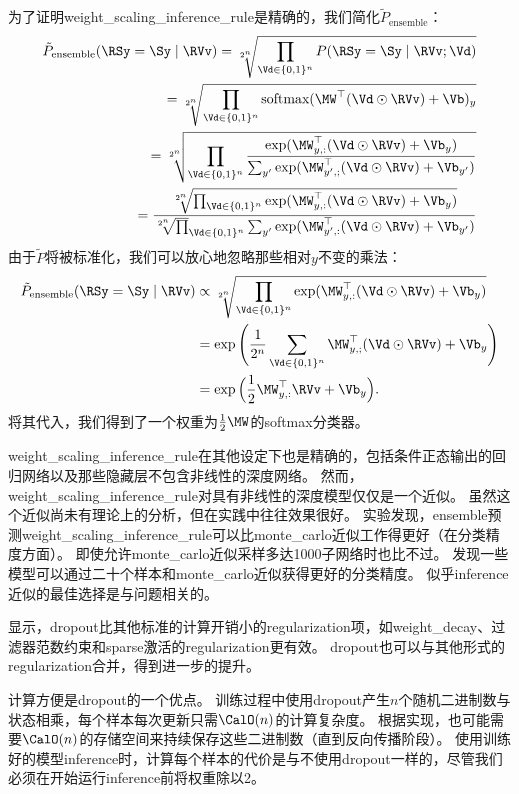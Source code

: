 为了证明\gls{weight_scaling_inference_rule}是精确的，我们简化$ \tilde{P}_{\text{ensemble}}$：
\begin{align}
\tilde{P}_{\text{ensemble}}(\RSy=\Sy \mid \RVv) =
\sqrt[2^n]{\prod_{\Vd \in \{0,1\}^n} P(\RSy = \Sy \mid \RVv; \Vd)} \\
= \sqrt[2^n]{\prod_{\Vd \in \{0,1\}^n} \text{softmax}(\MW^\top(\Vd \odot \RVv) + \Vb)_y} \\
= \sqrt[2^n]{\prod_{\Vd \in \{0,1\}^n} \frac{\exp (\MW_{y,:}^\top(\Vd \odot \RVv) + \Vb_y)}
{\sum_{y'}\exp (\MW_{y',;}^\top(\Vd \odot \RVv) + \Vb_{y'})}}\\
=  \frac{\sqrt[2^n]{\prod_{\Vd \in \{0,1\}^n}\exp (\MW_{y,:}^\top(\Vd \odot \RVv) + \Vb_y)}}
{ \sqrt[2^n] \prod_{\Vd \in \{0,1\}^n} \sum_{y'}\exp (\MW_{y',:}^\top(\Vd \odot \RVv) + \Vb_{y'})}
\end{align}
由于$\tilde P$将被标准化，我们可以放心地忽略那些相对$y$不变的乘法：
\begin{align}
\tilde{P}_{\text{ensemble}}(\RSy=\Sy \mid \RVv) &\propto 
\sqrt[2^n]{\prod_{\Vd \in \{0,1\}^n} \exp (\MW_{y,:}^\top(\Vd \odot \RVv) + \Vb_y)} \\
& = \exp \Bigg(\frac{1}{2^n} \sum_{\Vd \in \{0,1\}^n} \MW_{y,;}^\top(\Vd \odot \RVv) + \Vb_y \Bigg) \\
& = \exp \Big(\frac{1}{2}\MW_{y,:}^\top \RVv + \Vb_y \Big) .
\end{align}
将其代入，我们得到了一个权重为$\frac{1}{2}\MW$的\gls{softmax}分类器。


\gls{weight_scaling_inference_rule}在其他设定下也是精确的，包括条件正态输出的回归网络以及那些隐藏层不包含非线性的深度网络。
然而，\gls{weight_scaling_inference_rule}对具有非线性的深度模型仅仅是一个近似。
虽然这个近似尚未有理论上的分析，但在实践中往往效果很好。
\cite{Goodfellow-et-al-ICML2013}实验发现，\gls{ensemble}预测\gls{weight_scaling_inference_rule}可以比\gls{monte_carlo}近似工作得更好（在分类精度方面）。
即使允许\gls{monte_carlo}近似采样多达1000子网络时也比不过。
\cite{gal2015bayesian}发现一些模型可以通过二十个样本和\gls{monte_carlo}近似获得更好的分类精度。
似乎\gls{inference}近似的最佳选择是与问题相关的。

\cite{Srivastava14}显示，\gls{dropout}比其他标准的计算开销小的\gls{regularization}项，如\gls{weight_decay}、过滤器范数约束和\gls{sparse}激活的\gls{regularization}更有效。
\gls{dropout}也可以与其他形式的\gls{regularization}合并，得到进一步的提升。

计算方便是\gls{dropout}的一个优点。
训练过程中使用\gls{dropout}产生$n$个随机二进制数与状态相乘，每个样本每次更新只需$\CalO(n)$的计算复杂度。
根据实现，也可能需要$\CalO(n)$的存储空间来持续保存这些二进制数（直到反向传播阶段）。
使用训练好的模型\gls{inference}时，计算每个样本的代价是与不使用\gls{dropout}一样的，尽管我们必须在开始运行\gls{inference}前将权重除以2。

